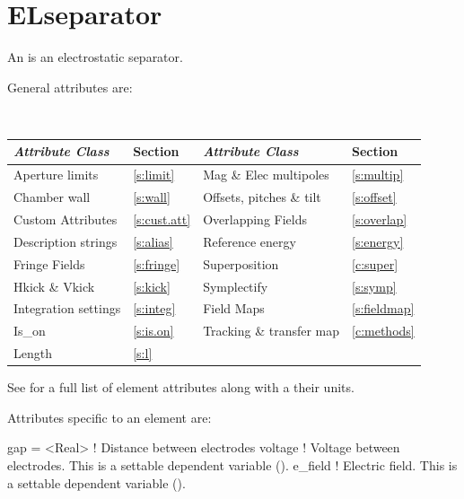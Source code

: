 \newpage

\section{ELseparator}
\label{s:elsep}

An  is an electrostatic separator.

General  attributes are:
\begin{center}
\tt
\begin{tabular}{llll} \toprule
  {\sl Attribute Class}      & Section           & {\sl Attribute Class}      & Section          \\ \midrule
  Aperture limits            & \ref{s:limit}     & Mag \& Elec multipoles     & \ref{s:multip}   \\
  Chamber wall               & \ref{s:wall}      & Offsets, pitches \& tilt   & \ref{s:offset}   \\
  Custom Attributes          & \ref{s:cust.att}  & Overlapping Fields         & \ref{s:overlap}  \\
  Description strings        & \ref{s:alias}     & Reference energy           & \ref{s:energy}   \\ 
  Fringe Fields              & \ref{s:fringe}    & Superposition              & \ref{c:super}    \\
  Hkick \& Vkick             & \ref{s:kick}      & Symplectify                & \ref{s:symp}     \\
  Integration settings       & \ref{s:integ}     & Field Maps                 & \ref{s:fieldmap} \\  
  Is_on                      & \ref{s:is.on}     & Tracking \& transfer map   & \ref{c:methods}  \\ 
  Length                     & \ref{s:l}         &                            &                  \\
  \bottomrule
\end{tabular}
\end{center}
\toffset
See  for a full list of element attributes along with a their units.

Attributes specific to an  element are:
\begin{example}
  gap = <Real> ! Distance between electrodes
  voltage      ! Voltage between electrodes. This is a settable dependent variable ().
  e_field      ! Electric field. This is a settable dependent variable ().
\end{example}

